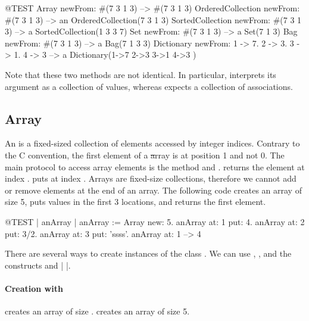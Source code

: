 \documentclass[a4paper,10pt,twoside]{book}
\begin{document}
\begin{code}{@TEST}
Array newFrom: #(7 3 1 3)                                          --> #(7 3 1 3)
OrderedCollection newFrom: #(7 3 1 3)                     --> an OrderedCollection(7 3 1 3)
SortedCollection newFrom: #(7 3 1 3)                       --> a SortedCollection(1 3 3 7)
Set newFrom: #(7 3 1 3)                                            --> a Set(7 1 3)
Bag newFrom: #(7 3 1 3)                                           --> a Bag(7 1 3 3)
Dictionary newFrom: {1 -> 7. 2 -> 3. 3 -> 1. 4 -> 3} --> a Dictionary(1->7 2->3 3->1 4->3 )
\end{code}
\noindent
Note that these two methods are not identical.
In particular,  interprets its argument as a collection of values, whereas  expects a collection of associations.

\subsection{Array}
An  is a fixed-sized collection of elements accessed by integer indices.
Contrary to the C convention, the first element of a \st array is at position 1 and not 0. 
The main protocol to access array elements is the method  and .
 returns the element at index .
 puts  at index .
Arrays are fixed-size collections, therefore we cannot add or remove elements at the end of an array.
The following code creates an array of size 5, puts values in the first 3 locations, and returns the first element. 

\begin{code}{@TEST | anArray | }
anArray := Array new: 5.
anArray at: 1 put: 4.
anArray at: 2 put: 3/2.
anArray at: 3 put: 'ssss'.
anArray at: 1 --> 4
\end{code}

There are several ways to create instances of the class .
We can use , , and  the constructs \ct{#( )} and \ct|{ }|.

\paragraph{Creation with }  creates an array of size .
 creates an array of size 5.
\end{document}
